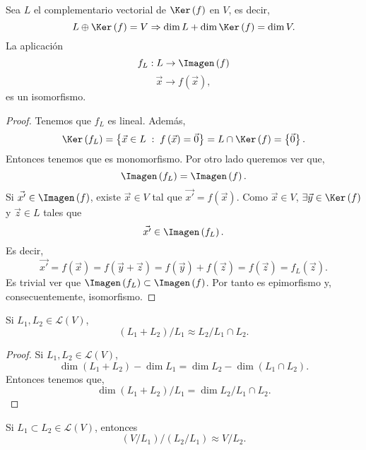 \begin{fprop}[]
\normalfont Sea $\displaystyle L $ el complementario vectorial de $\displaystyle \Ker\left(f\right) $ en $\displaystyle V $, es decir, 
\[L \oplus \Ker\left(f\right) = V \Rightarrow  \dim L + \dim \Ker\left(f\right) = \dim V .\]
La aplicación 
\[f_{L}: L \to \Imagen\left(f\right) \]
\[\vec{x} \to f\left(\vec{x}\right) ,\]
es un isomorfismo.
\end{fprop}

\begin{proof}
Tenemos que $\displaystyle f_{L} $ es lineal. Además, 
\[\Ker\left(f_{L}\right) = \left\{ \vec{x} \in L\; : \; f\left(\vec{x}\right)=\vec{0}\right\} = L \cap \Ker\left(f\right) = \left\{ \vec{0}\right\}  .\]
Entonces tenemos que es monomorfismo. Por otro lado queremos ver que, 
\[\Imagen\left(f_{L}\right) = \Imagen\left(f\right) .\]
Si $\displaystyle \vec{x'} \in \Imagen\left(f\right) $, existe $\displaystyle \vec{x} \in V $ tal que $\displaystyle \vec{x'} = f\left(\vec{x}\right) $. Como $\displaystyle \vec{x} \in V $, $\displaystyle \exists \vec{y} \in \Ker\left(f\right) $ y $\displaystyle \vec{z} \in L $ tales que
\[\vec{x'} \in \Imagen\left(f_{L}\right) .\]
Es decir, 
\[\vec{x'} = f\left(\vec{x}\right) = f\left(\vec{y}+\vec{z}\right) = f\left(\vec{y}\right)+f\left(\vec{z}\right) = f\left(\vec{z}\right) = f_{L}\left(\vec{z}\right) .\]
Es trivial ver que $\displaystyle \Imagen\left(f_{L}\right) \subset \Imagen\left(f\right)$. Por tanto es epimorfismo y, consecuentemente, isomorfismo. 
\end{proof}


\begin{fcolorary}[]
\normalfont Si $\displaystyle L_{1}, L_{2} \in \mathcal{L}\left(V\right) $, 
\[\left(L_{1}+L_{2}\right) / L_{1} \approx L_{2} / L_{1} \cap L_{2} .\]
\end{fcolorary}

\begin{proof}
Si $\displaystyle L_{1}, L_{2} \in \mathcal{L}\left(V\right) $,
\[\dim \left(L_{1}+L_{2}\right) - \dim L_{1} = \dim L_{2}-\dim\left(L_{1}\cap L_{2}\right) .\]
Entonces tenemos que, 
\[ \dim\left(L_{1}+L_{2}\right)/L_{1} = \dim L_{2} / L_{1}\cap L_{2} .\]


\end{proof}

\begin{fcolorary}[]
\normalfont Si $\displaystyle L_{1} \subset L_{2} \in \mathcal{L}\left(V\right) $, entonces
\[\left(V/L_{1}\right)/\left(L_{2}/L_{1}\right) \approx V/L_{2} .\]
\end{fcolorary}

